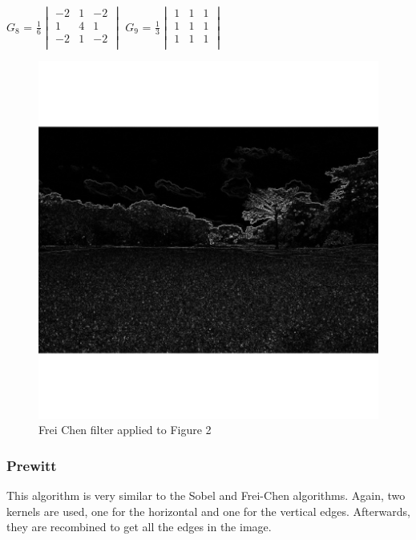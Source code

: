 \documentclass[12pt]{article}
\begin{document}
$G_8$ = $\frac{1}{6}$$\begin{vmatrix}
        -2 & 1 & -2\\
        1 & 4 & 1\\
        -2 & 1 & -2\\
\end{vmatrix}$\hspace{11mm}
$G_9$ = $\frac{1}{3}$$\begin{vmatrix}
        1 & 1 & 1\\
        1 & 1 & 1\\
        1 & 1 & 1\\
\end{vmatrix}$\hspace{5mm}

\begin{figure}[h]
\centering
\includegraphics[scale = 0.45]{img/landscape_FreiChen}
\caption{Frei Chen filter applied to Figure 2}
\end{figure}
\newpage

\subsubsection{Prewitt}
This algorithm is very similar to the Sobel and Frei-Chen algorithms. Again, two kernels are used, one for the horizontal and one for the vertical edges. Afterwards, they are recombined to get all the edges in the image.
\newline
\end{document}

